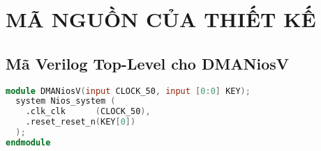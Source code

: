 \appendix

\chapter{MÃ NGUỒN CỦA THIẾT KẾ}
\label{Appendix1}

\section{Mã Verilog Top-Level cho DMANiosV}
\label{app:verilog_top} %
\begin{lstlisting}[language=Verilog, caption={DMANiosV.v - Top Level Module}, label=lst:verilog_top]
module DMANiosV(input CLOCK_50, input [0:0] KEY);
  system Nios_system (
    .clk_clk      (CLOCK_50),
    .reset_reset_n(KEY[0])
  );
endmodule
\end{lstlisting}

